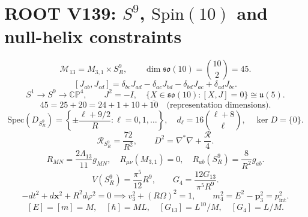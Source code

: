 \section*{ROOT V139: $S^9$, $\mathrm{Spin}(10)$ and null-helix constraints}
\[
\mathcal M_{13}=M_{3,1}\times S_R^9, \qquad
\dim\mathfrak{so}(10)=\binom{10}{2}=45.
\]
\[
[J_{ab},J_{cd}]=\delta_{bc}J_{ad}-\delta_{ac}J_{bd}-\delta_{bd}J_{ac}+\delta_{ad}J_{bc}.
\]
\[
S^1\longrightarrow S^9\longrightarrow\mathbb{CP}^4,
\qquad J^2=-I,
\quad \{X\in\mathfrak{so}(10):[X,J]=0\}\cong\mathfrak u(5).
\]
\[
45=25+20=24+1+10+\overline{10}\quad\text{(representation dimensions)}.
\]
\[
\mathrm{Spec}(D_{S_R^9})=\left\{\pm\frac{\ell+9/2}{R}:\ell=0,1,\dots\right\},
\quad d_\ell=16\binom{\ell+8}{\ell},\quad\ker D=\{0\}.
\]
\[
\mathcal R_{S_R^9}=\frac{72}{R^2},\qquad D^2=\nabla^*\nabla+\frac{\mathcal R}{4}.
\]
\[
R_{MN}=\frac{2\Lambda_{13}}{11}g_{MN},\quad
R_{\mu\nu}(M_{3,1})=0,\quad R_{ab}(S_R^9)=\frac8{R^2}g_{ab}.
\]
\[
V(S_R^9)=\frac{\pi^5}{12}R^9,
\qquad G_4=\frac{12G_{13}}{\pi^5R^9}.
\]
\[
-dt^2+d\mathbf x^2+R^2d\varphi^2=0\implies
v_3^2+(R\Omega)^2=1,
\qquad m_4^2=E^2-\mathbf p_3^2=p_{\mathrm{int}}^2.
\]
\[
[E]=[m]=M,\quad [\hbar]=ML,\quad [G_{13}]=L^{10}/M,\quad [G_4]=L/M.
\]
